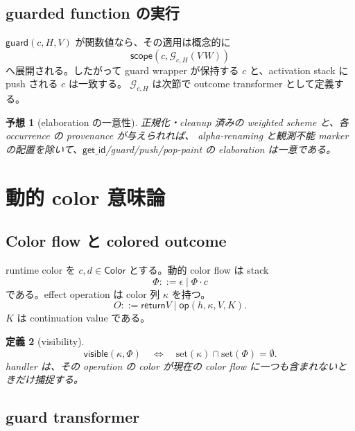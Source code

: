 \documentclass[uplatex,dvipdfmx,a4paper,11pt]{jsarticle}
\theoremstyle{jpplain}
\newtheorem{definition}{定義}[section]
\newtheorem{conjecture}[definition]{予想}
\newcommand{\Color}{\mathsf{Color}}
\newcommand{\flow}{\Phi}
\newcommand{\colors}{\kappa}
\newcommand{\visible}{\mathsf{visible}}
\newcommand{\Guard}{\mathcal G}
\newcommand{\ret}{\mathsf{return}}
\newcommand{\oper}{\mathsf{op}}
\newcommand{\scope}{\mathsf{scope}}
\newcommand{\getid}{\mathsf{get\_id}}
\newcommand{\guard}{\mathsf{guard}}
\begin{document}
\subsection{guarded function の実行}

$\guard(c,H,V)$ が関数値なら、その適用は概念的に
\[
  \scope(c,\Guard_{c,H}(V\,W))
\]
へ展開される。したがって guard wrapper が保持する $c$ と、activation stack に push される $c$ は一致する。
$\Guard_{c,H}$ は次節で outcome transformer として定義する。

\begin{conjecture}[elaboration の一意性]
正規化・cleanup 済みの weighted scheme と、各 occurrence の provenance が与えられれば、
alpha-renaming と観測不能 marker の配置を除いて、$\getid$/guard/push/pop-paint の elaboration は一意である。
\end{conjecture}

\section{動的 color 意味論}

\subsection{Color flow と colored outcome}

runtime color を $c,d\in\Color$ とする。動的 color flow は stack
\[
  \flow ::= \epsilon \mid \flow\cdot c
\]
である。effect operation は color 列 $\colors$ を持つ。
\[
 O ::= \ret V \mid \oper(h,\colors,V,K).
\]
$K$ は continuation value である。

\begin{definition}[visibility]
\[
  \visible(\colors,\flow)
  \quad\Longleftrightarrow\quad
  \mathrm{set}(\colors)\cap\mathrm{set}(\flow)=\emptyset.
\]
handler は、その operation の color が現在の color flow に一つも含まれないときだけ捕捉する。
\end{definition}

\subsection{guard transformer}
\end{document}
